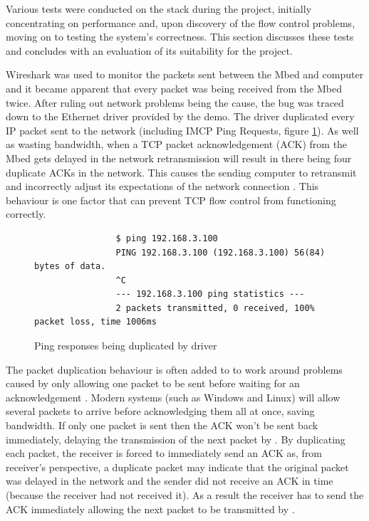 		
		Various tests were conducted on the \uIP{} stack during the project,
		initially concentrating on performance and, upon discovery of the flow
		control problems, moving on to testing the system's correctness. This
		section discusses these tests and concludes with an evaluation of its
		suitability for the project.
		
		
		\label{sec:udpPerformance}
		
		Wireshark was used to monitor the packets sent between the Mbed and computer
		and it became apparent that every packet was being received from the Mbed
		twice. After ruling out network problems being the cause, the bug was traced
		down to the Ethernet driver provided by the demo. The driver duplicated
		every IP packet sent to the network (including IMCP Ping Requests, figure
		\ref{fig:ping}). As well as wasting bandwidth, when a TCP packet
		acknowledgement (ACK) from the Mbed gets delayed in the network
		retransmission will result in there being four duplicate ACKs in the
		network. This causes the sending computer to retransmit and incorrectly
		adjust its expectations of the network connection \cite{duplicateack}. This
		behaviour is one factor that can prevent TCP flow control from functioning
		correctly.
		
		\begin{figure}
			\begin{verbatim}
				$ ping 192.168.3.100
				PING 192.168.3.100 (192.168.3.100) 56(84) bytes of data.
				^C
				--- 192.168.3.100 ping statistics ---
				2 packets transmitted, 0 received, 100% packet loss, time 1006ms
			\end{verbatim}
			\caption{Ping responses being duplicated by \uIP{} driver}
			\label{fig:ping}
		\end{figure}
		
		The packet duplication behaviour is often added to to work around problems
		caused by \uIP{} only allowing one packet to be sent before waiting for an
		acknowledgement \cite{allpacketsdup}. Modern systems (such as Windows and
		Linux) will allow several packets to arrive before acknowledging them all at
		once, saving bandwidth. If only one packet is sent then the ACK won't be
		sent back immediately, delaying the transmission of the next packet by
		\uIP{}. By duplicating each packet, the receiver is forced to immediately
		send an ACK as, from receiver's perspective, a duplicate packet may indicate
		that the original packet was delayed in the network and the sender did not
		receive an ACK in time (because the receiver had not received it). As a
		result the receiver has to send the ACK immediately allowing the next packet
		to be transmitted by \uIP{}.
		
